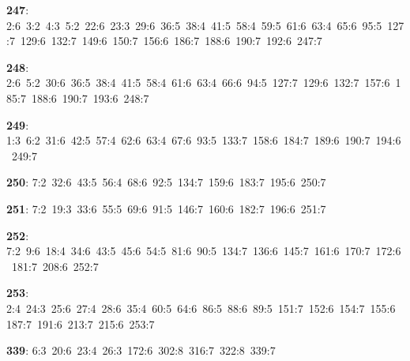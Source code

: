 \noindent \textbf{247}: 2:6\allowbreak\ 3:2\allowbreak\ 4:3\allowbreak\ 5:2\allowbreak\ 22:6\allowbreak\ 23:3\allowbreak\ 29:6\allowbreak\ 36:5\allowbreak\ 38:4\allowbreak\ 41:5\allowbreak\ 58:4\allowbreak\ 59:5\allowbreak\ 61:6\allowbreak\ 63:4\allowbreak\ 65:6\allowbreak\ 95:5\allowbreak\ 127:7\allowbreak\ 129:6\allowbreak\ 132:7\allowbreak\ 149:6\allowbreak\ 150:7\allowbreak\ 156:6\allowbreak\ 186:7\allowbreak\ 188:6\allowbreak\ 190:7\allowbreak\ 192:6\allowbreak\ 247:7\par
\noindent \textbf{248}: 2:6\allowbreak\ 5:2\allowbreak\ 30:6\allowbreak\ 36:5\allowbreak\ 38:4\allowbreak\ 41:5\allowbreak\ 58:4\allowbreak\ 61:6\allowbreak\ 63:4\allowbreak\ 66:6\allowbreak\ 94:5\allowbreak\ 127:7\allowbreak\ 129:6\allowbreak\ 132:7\allowbreak\ 157:6\allowbreak\ 185:7\allowbreak\ 188:6\allowbreak\ 190:7\allowbreak\ 193:6\allowbreak\ 248:7\par
\noindent \textbf{249}: 1:3\allowbreak\ 6:2\allowbreak\ 31:6\allowbreak\ 42:5\allowbreak\ 57:4\allowbreak\ 62:6\allowbreak\ 63:4\allowbreak\ 67:6\allowbreak\ 93:5\allowbreak\ 133:7\allowbreak\ 158:6\allowbreak\ 184:7\allowbreak\ 189:6\allowbreak\ 190:7\allowbreak\ 194:6\allowbreak\ 249:7\par
\noindent \textbf{250}: 7:2\allowbreak\ 32:6\allowbreak\ 43:5\allowbreak\ 56:4\allowbreak\ 68:6\allowbreak\ 92:5\allowbreak\ 134:7\allowbreak\ 159:6\allowbreak\ 183:7\allowbreak\ 195:6\allowbreak\ 250:7\par
\noindent \textbf{251}: 7:2\allowbreak\ 19:3\allowbreak\ 33:6\allowbreak\ 55:5\allowbreak\ 69:6\allowbreak\ 91:5\allowbreak\ 146:7\allowbreak\ 160:6\allowbreak\ 182:7\allowbreak\ 196:6\allowbreak\ 251:7\par
\noindent \textbf{252}: 7:2\allowbreak\ 9:6\allowbreak\ 18:4\allowbreak\ 34:6\allowbreak\ 43:5\allowbreak\ 45:6\allowbreak\ 54:5\allowbreak\ 81:6\allowbreak\ 90:5\allowbreak\ 134:7\allowbreak\ 136:6\allowbreak\ 145:7\allowbreak\ 161:6\allowbreak\ 170:7\allowbreak\ 172:6\allowbreak\ 181:7\allowbreak\ 208:6\allowbreak\ 252:7\par
\noindent \textbf{253}: 2:4\allowbreak\ 24:3\allowbreak\ 25:6\allowbreak\ 27:4\allowbreak\ 28:6\allowbreak\ 35:4\allowbreak\ 60:5\allowbreak\ 64:6\allowbreak\ 86:5\allowbreak\ 88:6\allowbreak\ 89:5\allowbreak\ 151:7\allowbreak\ 152:6\allowbreak\ 154:7\allowbreak\ 155:6\allowbreak\ 187:7\allowbreak\ 191:6\allowbreak\ 213:7\allowbreak\ 215:6\allowbreak\ 253:7\par
\noindent \textbf{339}: 6:3\allowbreak\ 20:6\allowbreak\ 23:4\allowbreak\ 26:3\allowbreak\ 172:6\allowbreak\ 302:8\allowbreak\ 316:7\allowbreak\ 322:8\allowbreak\ 339:7\par
